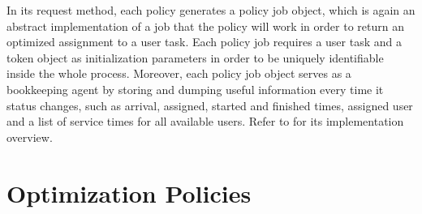 \documentclass[draft=false]{seal_thesis}
\begin{document}

In its request method, each policy generates a policy job object, which is again an abstract implementation of a job that the policy will work in order to return an optimized assignment to a user task. Each policy job requires a user task and a token object as initialization parameters in order to be uniquely identifiable inside the whole process. Moreover, each policy job object serves as a bookkeeping agent by storing and dumping useful information every time it status changes, such as arrival, assigned, started and finished times, assigned user and a list of service times for all available users. Refer to  for its implementation overview.


\section{Optimization Policies}
\label{sec:opt_policies}
\end{document}

